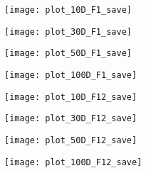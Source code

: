 \begin{figure*}[h!]
    \centering
    \begin{subfigure}[b]{0.24\textwidth}
        \texttt{[image: plot\_10D\_F1\_save]}
        \caption{}
    \end{subfigure}
    \begin{subfigure}[b]{0.24\textwidth}
        \texttt{[image: plot\_30D\_F1\_save]}
        \caption{}
    \end{subfigure}    
    \begin{subfigure}[b]{0.24\textwidth}
        \texttt{[image: plot\_50D\_F1\_save]}
        \caption{}
    \end{subfigure}
    \begin{subfigure}[b]{0.24\textwidth}
        \texttt{[image: plot\_100D\_F1\_save]}
        \caption{}
    \end{subfigure}

    \begin{subfigure}[b]{0.24\textwidth}
        \texttt{[image: plot\_10D\_F12\_save]}
        \caption{}
    \end{subfigure}
    \begin{subfigure}[b]{0.24\textwidth}
        \texttt{[image: plot\_30D\_F12\_save]}
        \caption{}
    \end{subfigure}        
    \begin{subfigure}[b]{0.24\textwidth}
        \texttt{[image: plot\_50D\_F12\_save]}
        \caption{}
    \end{subfigure}
    \begin{subfigure}[b]{0.24\textwidth}
        \texttt{[image: plot\_100D\_F12\_save]}
        \caption{}
    \end{subfigure}


\end{figure*}
